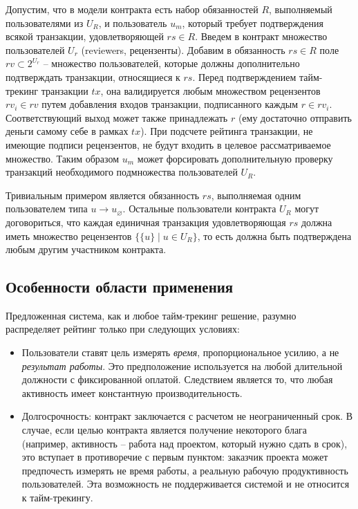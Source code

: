 \documentclass[specification,annotation]{itmo-student-thesis}
\begin{document}
Допустим, что в модели контракта есть набор обязанностей $R$,
выполняемый пользователями из $U_R$, и пользователь $u_m$, который
требует подтверждения всякой транзакции, удовлетворяющей $rs \in
R$. Введем в контракт множество пользователей $U_r$ (reviewers,
рецензенты). Добавим в обязанность $rs \in R$ поле $rv \subset 2^{U_r}$ --
множество пользователей, которые должны дополнительно подтверждать
транзакции, относящиеся к $rs$. Перед подтверждением тайм-трекинг
транзакции $tx$, она валидируется любым множеством рецензентов $rv_i
\in rv$ путем добавления входов транзакции, подписанного каждым $r \in
rv_i$. Соответствующий выход может также принадлежать $r$ (ему
достаточно отправить деньги самому себе в рамках $tx$). При подсчете
рейтинга транзакции, не имеющие подписи рецензентов, не будут входить
в целевое рассматриваемое множество. Таким образом $u_m$ может
форсировать дополнительную проверку транзакций необходимого
подмножества пользователей $U_R$.

Тривиальным примером является обязанность $rs$, выполняемая одним
пользователем типа $u \rightarrow u_{\varnothing}$. Остальные
пользователи контракта $U_R$ могут договориться, что каждая единичная
транзакция удовлетворяющая $rs$ должна иметь множество рецензентов
$\{\{u\} \mid u \in U_R\}$, то есть должна быть подтверждена любым
другим участником контракта.

\subsection{Особенности области применения}

Предложенная система, как и любое тайм-трекинг решение, разумно
распределяет рейтинг только при следующих условиях:
\begin{itemize}
  \item Пользователи ставят цель измерять {\it время},
    пропорциональное усилию, а не {\it результат работы}. Это
    предположение используется на любой длительной должности с
    фиксированной оплатой. Следствием является то, что любая
    активность имеет константную производительность.
  \item Долгосрочность: контракт заключается с расчетом не
    неограниченный срок. В случае, если целью контракта является
    получение некоторого блага (например, активность -- работа над
    проектом, который нужно сдать в срок), это вступает в противоречие
    с первым пунктом: заказчик проекта может предпочесть измерять не
    время работы, а реальную рабочую продуктивность пользователей. Эта
    возможность не поддерживается системой и не относится к
    тайм-трекингу.
\end{itemize}
\end{document}
